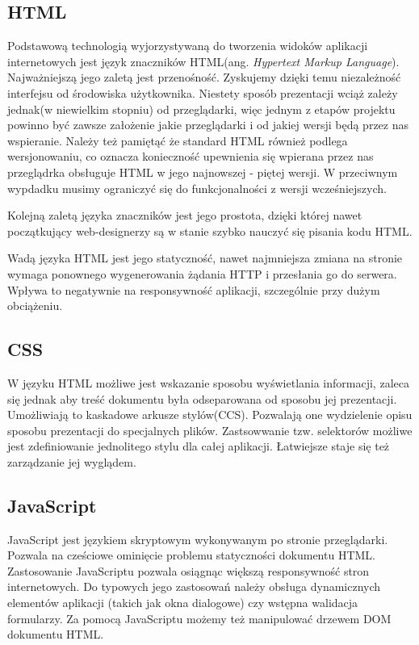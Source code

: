 \subsection[HTML][HTML]{HTML}
Podstawową technologią wyjorzystywaną do tworzenia widoków aplikacji internetowych jest język znaczników HTML(ang. \textit{Hypertext Markup Language}). Najważniejszą jego zaletą jest przenośność. Zyskujemy dzięki temu niezależność interfejsu od środowiska użytkownika. Niestety sposób prezentacji wciąż zależy jednak(w niewielkim stopniu) od przeglądarki, więc jednym z etapów projektu powinno być zawsze założenie jakie przeglądarki i od jakiej wersji będą przez nas wspieranie. Należy też pamiętąć że standard HTML również podlega wersjonowaniu, co oznacza konieczność upewnienia się wpierana przez nas przeglądrka obsługuje HTML w jego najnowszej - piętej wersji. W przeciwnym wypdadku musimy ograniczyć się do funkcjonalności z wersji wcześniejszych.

Kolejną zaletą języka znaczników jest jego prostota, dzięki której nawet początkujący web-designerzy są w stanie szybko nauczyć się pisania kodu HTML.

Wadą języka HTML jest jego statyczność, nawet najmniejsza zmiana na stronie wymaga ponownego wygenerowania żądania HTTP i przesłania go do serwera. Wpływa to negatywnie na responsywność aplikacji, szczególnie przy dużym obciążeniu. 

\subsection[CSS][CSS]{CSS}
W języku HTML możliwe jest wskazanie sposobu wyświetlania informacji, zaleca się jednak aby treść dokumentu była odseparowana od sposobu jej prezentacji. Umożliwiają to kaskadowe arkusze stylów(CCS). Pozwalają one wydzielenie opisu sposobu prezentacji do specjalnych plików. Zastsowwanie tzw. selektorów możliwe jest zdefiniowanie jednolitego stylu dla całej aplikacji. Łatwiejsze staje się też zarządzanie jej wyglądem.

\subsection[JavaScript][JavaScript]{JavaScript}
JavaScript jest językiem skryptowym wykonywanym po stronie przeglądarki. Pozwala na cześciowe ominięcie problemu statyczności dokumentu HTML. Zastosowanie JavaScriptu pozwala osiągnąc większą responsywność stron internetowych. Do typowych jego zastosowań należy obsługa dynamicznych elementów aplikacji (takich jak okna dialogowe) czy wstępna walidacja formularzy. Za pomocą JavaScriptu możemy też manipulować drzewem DOM dokumentu HTML.

